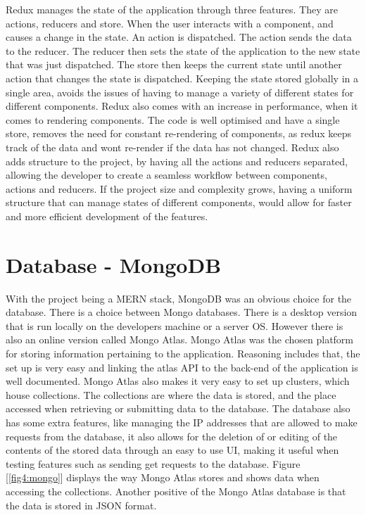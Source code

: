 Redux manages the state of the application through three features. They are actions, reducers and store. When the user interacts with a component, and causes a change in the state. An action is dispatched. The action sends the data to the reducer. The reducer then sets the state of the application to the new state that was just dispatched. The store then keeps the current state until another action that changes the state is dispatched. Keeping the state stored globally in a single area, avoids the issues of having to manage a variety of different states for different components. Redux also comes with an increase in performance, when it comes to rendering components. The code is well optimised and have a single store, removes the need for constant re-rendering of components, as redux keeps track of the data and wont re-render if the data has not changed. Redux also adds structure to the project, by having all the actions and reducers separated, allowing the developer to create a seamless workflow between components, actions and reducers. If the project size and complexity grows, having a uniform structure that can manage states of different components, would allow for faster and more efficient development of the features.

\section{Database - MongoDB}
With the project being a MERN stack, MongoDB was an obvious choice for the database. There is a choice between Mongo databases. There is a desktop version that is run locally on the developers machine or a server OS. However there is also an online version called Mongo Atlas. Mongo Atlas was the chosen platform for storing information pertaining to the application. Reasoning includes that, the set up is very easy and linking the atlas API to the back-end of the application is well documented. Mongo Atlas also makes it very easy to set up clusters, which house collections. The collections are where the data is stored, and the place accessed when retrieving or submitting data to the database. The database also has some extra features, like managing the IP addresses that are allowed to make requests from the database, it also allows for the deletion of or editing of the contents of the stored data through an easy to use UI, making it useful when testing features such as sending get requests to the database. Figure [\ref{fig4:mongo}] displays the way Mongo Atlas stores and shows data when accessing the collections. Another positive of the Mongo Atlas database is that the data is stored in JSON format.

